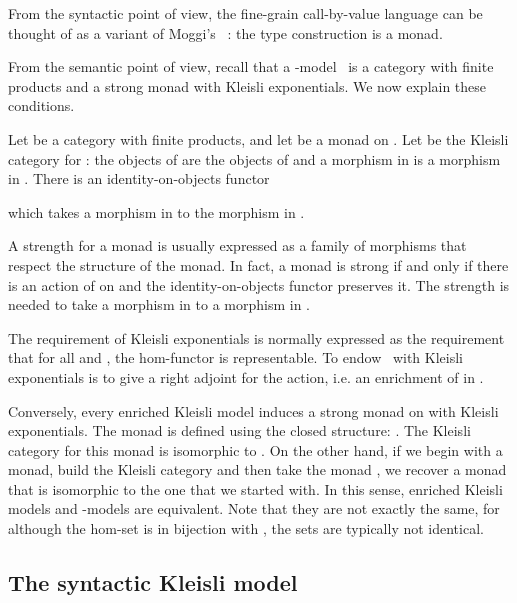 \documentclass{LMCS}
\begin{document}
From the syntactic point of view, 
the fine-grain call-by-value language 
can be thought of as a variant of Moggi's ~\cite{Moggi:89}:
the type construction  is a
monad.  

From the semantic point of view, 
recall that a -model~\cite{Moggi:89}
is a category with finite products and a strong monad 
with Kleisli exponentials. We now explain these conditions.

Let  be a category with finite products,
and let  be a monad on .
Let  be the Kleisli category for : the objects of  are 
the objects of  and a morphism  in  is a morphism
 in . 
There is an identity-on-objects functor
 
which takes a morphism  in 
to the morphism  in .

A strength for a monad  is usually expressed 
as a family of morphisms 
that respect the structure of the monad.
In fact, a monad is strong if and only if 
there is an action of  on  and the
identity-on-objects functor  
preserves it.
The strength is needed to 
take a morphism  in 
to  a morphism  
in .

The requirement of Kleisli exponentials is normally 
expressed as the requirement that for all  and ,
the hom-functor 
 is representable.
To endow~ with Kleisli exponentials is to 
give a right adjoint for the action,
i.e. an enrichment of  in .

Conversely, every enriched Kleisli model  
induces a strong monad on  with Kleisli exponentials.
The monad is defined using the closed structure:
.
The Kleisli category for this monad is isomorphic to .
On the other hand, if we begin with a monad, build the Kleisli category
and then take the monad , we recover a monad that is isomorphic
to the one that we started with. 
In this sense, enriched Kleisli models and -models are equivalent.
Note that they are not exactly the same,
for although the hom-set  is in bijection with
, the sets are typically not identical.

\subsection{The syntactic Kleisli model}
\label{sec:syn:Kl:model}
\end{document}
